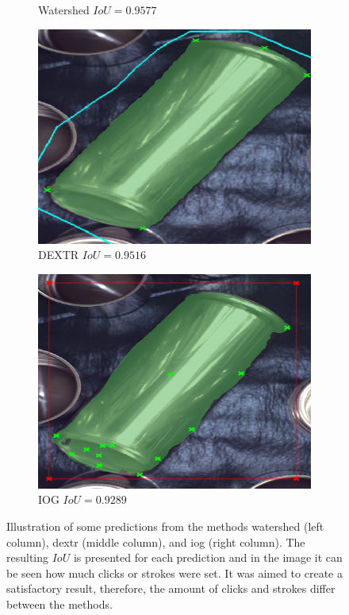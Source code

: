 \begin{figure}
\begin{subfigure}[t]{0.3\textwidth}
		\caption{
			Watershed $ IoU = 0.9577 $
		}
	\end{subfigure}
	\hfill
	\begin{subfigure}[t]{0.3\textwidth}
		\centering
		\includegraphics[width=\textwidth]{figures/appendix/method_predictions/cans75_dextr.png}
		\caption{
			DEXTR $ IoU = 0.9516 $
		}
	\end{subfigure}
	\hfill
	\begin{subfigure}[t]{0.3\textwidth}
		\centering
		\includegraphics[width=\textwidth]{figures/appendix/method_predictions/cans75_iog.png}
		\caption{
			IOG $ IoU = 0.9289 $
		}
	\end{subfigure}
	\caption[Predictions from watershed, DEXTR, and IOG]{
		Illustration of some predictions from the methods watershed (left column), \gls{dextr} (middle column), and \gls{iog} (right column).
		The resulting $ IoU $ is presented for each prediction and in the image it can be seen how much clicks or strokes were set.
		It was aimed to create a satisfactory result, therefore, the amount of clicks and strokes differ between the methods. 
	}\label{fig:appendix_model_predictions}
\end{figure}
	
